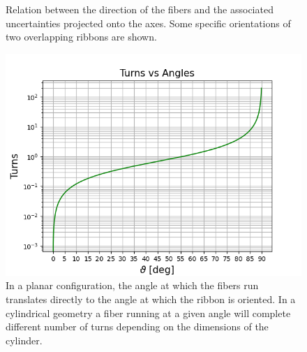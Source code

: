 \begin{refsection}
\begin{figure}
\caption{Relation between the direction of the fibers and the associated uncertainties projected onto the axes. Some specific orientations of two overlapping ribbons are shown.}
\end{figure}

\begin{figure}
    \centering
    \includegraphics[width=\textwidth]{Figures/muEDM/CyFi/TurnsVsAngles.png}
    \caption{In a planar configuration, the angle at which the fibers run translates directly to the angle at which the ribbon is oriented. In a cylindrical geometry a fiber running at a given angle will complete different number of turns depending on the dimensions of the cylinder.}
    \label{fig:CyFi:TurnsVsAngles}
\end{figure}



\end{refsection}
